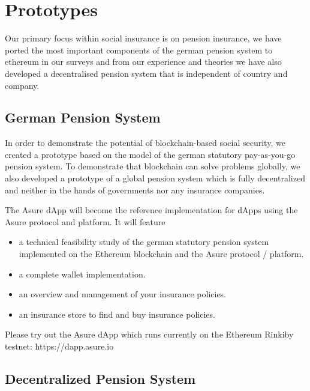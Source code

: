 \section{Prototypes}

Our primary focus within social insurance is on pension insurance, we have ported the most important components of the german pension system to ethereum in our surveys and from our experience and theories we have also developed a decentralised pension system that is independent of country and company.

\subsection{German Pension System}

In order to demonstrate the potential of blockchain-based social security, we created a prototype based on the model of the german statutory pay-as-you-go pension system. To demonstrate that blockchain can solve problems globally, we also developed a prototype of a global pension system which is fully decentralized and neither in the hands of governments nor any insurance companies.

The Asure dApp will become the reference implementation for dApps using the Asure protocol and platform. 
\newline\newline
It will feature
\begin{itemize}
\item a technical feasibility study of the german statutory pension system implemented on the Ethereum blockchain and the Asure protocol / platform.
\item a complete wallet implementation.
\item an overview and management of your insurance policies.
\item an insurance store to find and buy insurance policies.
\end{itemize}

Please try out the Asure dApp which runs currently on the Ethereum Rinkiby testnet: 
https://dapp.asure.io

\subsection{Decentralized Pension System}

